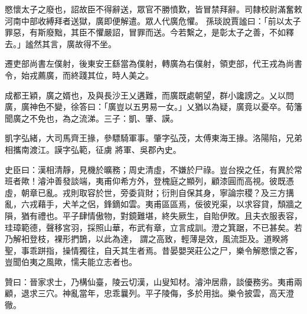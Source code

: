 \begin{pinyinscope}
 愍懷太子之廢也，詔故臣不得辭送，眾官不勝憤歎，皆冒禁拜辭。司隸校尉滿奮敕河南中部收縛拜者送獄，廣即便解遣。眾人代廣危懼。
 孫琰說賈謐曰：「前以太子罪惡，有斯廢黜，其臣不懼嚴詔，冒罪而送。今若繫之，是彰太子之善，不如釋去。」謐然其言，廣故得不坐。



 遷吏部尚書左僕射，後東安王繇當為僕射，轉廣為右僕射，領吏部，代王戎為尚書令，始戎薦廣，而終踐其位，時人美之。



 成都王穎，廣之婿也，及與長沙王乂遘難，而廣既處朝望，群小讒謗之。乂以問廣，廣神色不變，徐答曰：「廣豈以五男易一女。」乂猶以為疑，廣竟以憂卒。荀籓聞廣之不免也，為之流涕。三子：凱、肇、謨。



 凱字弘緒，大司馬齊王掾，參驃騎軍事。肇字弘茂，太傅東海王掾。洛陽陷，兄弟相攜南渡江。謨字弘範，征虜
 將軍、吳郡內史。



 史臣曰：漢相清靜，見機於曠務；周史清虛，不嫌於尸祿。豈台揆之任，有異於常班者歟！濬沖善發談端，夷甫仰希方外，登槐庭之顯列，顧漆圓而高視。彼既憑虛，朝章已亂。戎則取容於世，旁委貨財；衍則自保其身，寧論宗稷？及三方搆亂，六戎藉手，犬羊之侶，鋒鏑如雲。夷甫區區焉，佞彼兇渠，以求容貸，頹牆之隕，猶有禮也。平子肆情傲物，對鏡難堪，終失厥生，自貽伊敗。且夫衣服表容，珪璋範德，聲移宮羽，採照山華，布武有章，立言成訓。澄之箕踞，不已甚矣。若乃解衵登枝，裸形捫鵲，以此為達，
 謂之高致，輕薄是效，風流詎及。道睽將聖，事乖跰指，操情獨往，自夭其生者焉。昔晏嬰哭莊公之尸，樂令解愍懷之客，豈聞伯夷之風歟，懦夫能立志者也。



 贊曰：晉家求士，乃構仙臺，陵云切漢，山叟知材。濬沖居鼎，談優務劣。夷甫兩顧，退求三穴。神亂當年，忠乖曩列。平子陵侮，多於用拙。樂令披雲，高天澄徹。



\end{pinyinscope}